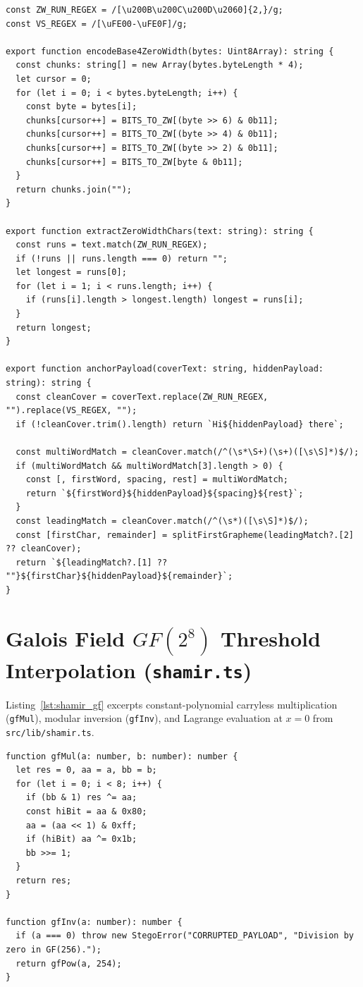 \documentclass[12pt,a4paper,oneside,openany]{report}
\begin{document}
\begin{lstlisting}[caption=Base-4 Encoding, Contiguous Extraction, and Interior Anchoring, label={lst:stego_core}]
const ZW_RUN_REGEX = /[\u200B\u200C\u200D\u2060]{2,}/g;
const VS_REGEX = /[\uFE00-\uFE0F]/g;

export function encodeBase4ZeroWidth(bytes: Uint8Array): string {
  const chunks: string[] = new Array(bytes.byteLength * 4);
  let cursor = 0;
  for (let i = 0; i < bytes.byteLength; i++) {
    const byte = bytes[i];
    chunks[cursor++] = BITS_TO_ZW[(byte >> 6) & 0b11];
    chunks[cursor++] = BITS_TO_ZW[(byte >> 4) & 0b11];
    chunks[cursor++] = BITS_TO_ZW[(byte >> 2) & 0b11];
    chunks[cursor++] = BITS_TO_ZW[byte & 0b11];
  }
  return chunks.join("");
}

export function extractZeroWidthChars(text: string): string {
  const runs = text.match(ZW_RUN_REGEX);
  if (!runs || runs.length === 0) return "";
  let longest = runs[0];
  for (let i = 1; i < runs.length; i++) {
    if (runs[i].length > longest.length) longest = runs[i];
  }
  return longest;
}

export function anchorPayload(coverText: string, hiddenPayload: string): string {
  const cleanCover = coverText.replace(ZW_RUN_REGEX, "").replace(VS_REGEX, "");
  if (!cleanCover.trim().length) return `Hi${hiddenPayload} there`;

  const multiWordMatch = cleanCover.match(/^(\s*\S+)(\s+)([\s\S]*)$/);
  if (multiWordMatch && multiWordMatch[3].length > 0) {
    const [, firstWord, spacing, rest] = multiWordMatch;
    return `${firstWord}${hiddenPayload}${spacing}${rest}`;
  }
  const leadingMatch = cleanCover.match(/^(\s*)([\s\S]*)$/);
  const [firstChar, remainder] = splitFirstGrapheme(leadingMatch?.[2] ?? cleanCover);
  return `${leadingMatch?.[1] ?? ""}${firstChar}${hiddenPayload}${remainder}`;
}
\end{lstlisting}

\section{Galois Field $GF(2^8)$ Threshold Interpolation (\texttt{shamir.ts})}
Listing~\ref{lst:shamir_gf} excerpts constant-polynomial carryless multiplication (\texttt{gfMul}), modular inversion (\texttt{gfInv}), and Lagrange evaluation at $x=0$ from \texttt{src/lib/shamir.ts}.

\begin{lstlisting}[caption=GF(256) Arithmetic and Lagrange Secret Recovery, label={lst:shamir_gf}]
function gfMul(a: number, b: number): number {
  let res = 0, aa = a, bb = b;
  for (let i = 0; i < 8; i++) {
    if (bb & 1) res ^= aa;
    const hiBit = aa & 0x80;
    aa = (aa << 1) & 0xff;
    if (hiBit) aa ^= 0x1b;
    bb >>= 1;
  }
  return res;
}

function gfInv(a: number): number {
  if (a === 0) throw new StegoError("CORRUPTED_PAYLOAD", "Division by zero in GF(256).");
  return gfPow(a, 254);
}
\end{lstlisting}
\end{document}
